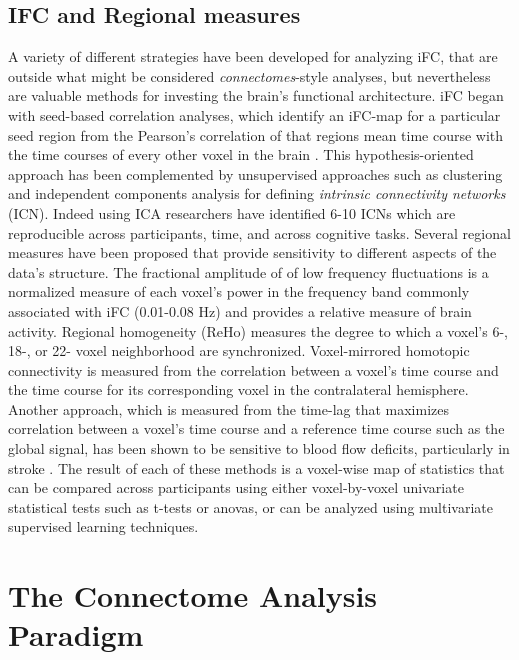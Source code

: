 \subsection*{IFC and Regional measures}

A variety of different strategies have been developed for analyzing iFC, that are outside what might be considered \emph{connectomes}-style analyses, but nevertheless are valuable methods for investing the brain's functional architecture. iFC began with seed-based correlation analyses, which identify an iFC-map for a particular seed region from the Pearson's correlation of that regions mean time course with the time courses of every other voxel in the brain \cite{biswal1995}. This hypothesis-oriented approach has been complemented by unsupervised approaches such as clustering and independent components analysis for defining \emph{intrinsic connectivity networks} (ICN). Indeed using ICA researchers have identified 6-10 ICNs which are reproducible across participants, time, and across cognitive tasks. Several regional measures have been proposed that provide sensitivity to different aspects of the data's structure. The fractional amplitude of of low frequency fluctuations is a normalized measure of each voxel's power in the frequency band commonly associated with iFC (0.01-0.08 Hz) and provides a relative measure of brain activity. Regional homogeneity (ReHo) measures the degree to which a voxel's 6-, 18-, or 22- voxel neighborhood are synchronized. Voxel-mirrored homotopic connectivity is measured from the correlation between a voxel's time course and the time course for its corresponding voxel in the contralateral hemisphere. Another approach, which is measured from the time-lag that maximizes correlation between a voxel's time course and a reference time course such as the global signal, has been shown to be sensitive to blood flow deficits, particularly in stroke \cite{lv}. The result of each of these methods is a voxel-wise map of statistics that can be compared across participants using either voxel-by-voxel univariate statistical tests such as t-tests or anovas, or can be analyzed using multivariate supervised learning techniques.

\section{The Connectome Analysis Paradigm}

